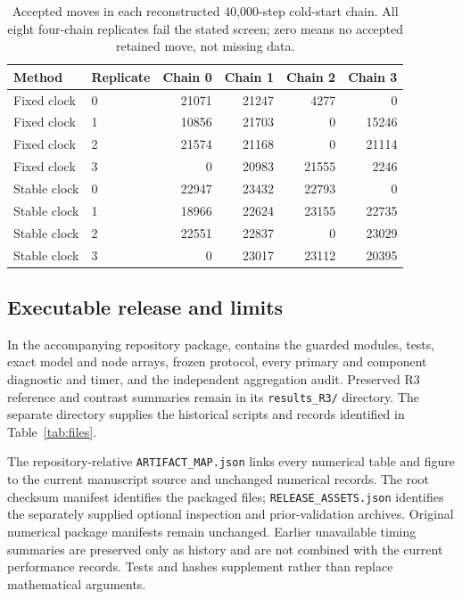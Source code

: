 \documentclass[11pt]{article}
\theoremstyle{definition}\newtheorem{definition}[theorem]{Definition}
\theoremstyle{remark}\newtheorem{remark}[theorem]{Remark}
\numberwithin{equation}{section}
\newcommand{\1}{\mathbf 1}
\begin{document}
\begin{table}[!htbp]\centering\small
\caption{Accepted moves in each reconstructed 40,000-step cold-start chain. All eight four-chain replicates fail the stated screen; zero means no accepted retained move, not missing data.}\label{tab:cold_r3_counts}
\begin{tabular}{llrrrr}\toprule
Method&Replicate&Chain 0&Chain 1&Chain 2&Chain 3\\\midrule
Fixed clock&0&21071 & 21247 & 4277 & 0\\
Fixed clock&1&10856 & 21703 & 0 & 15246\\
Fixed clock&2&21574 & 21168 & 0 & 21114\\
Fixed clock&3&0 & 20983 & 21555 & 2246\\
Stable clock&0&22947 & 23432 & 22793 & 0\\
Stable clock&1&18966 & 22624 & 23155 & 22735\\
Stable clock&2&22551 & 22837 & 0 & 23029\\
Stable clock&3&0 & 23017 & 23112 & 20395\\
\bottomrule\end{tabular}\end{table}

\subsection{Executable release and limits}
In the accompanying repository package,  contains the guarded modules, tests, exact model and node arrays, frozen protocol, every primary and component diagnostic and timer, and the independent aggregation audit. Preserved R3 reference and contrast summaries remain in its \texttt{results\_R3/} directory. The separate directory  supplies the historical scripts and records identified in Table~\ref{tab:files}.

The repository-relative \texttt{ARTIFACT\_MAP.json} links every numerical table and figure to the current manuscript source and unchanged numerical records. The root checksum manifest identifies the packaged files; \texttt{RELEASE\_ASSETS.json} identifies the separately supplied optional inspection and prior-validation archives. Original numerical package manifests remain unchanged. Earlier unavailable timing summaries are preserved only as history and are not combined with the current performance records. Tests and hashes supplement rather than replace mathematical arguments.
\end{document}
